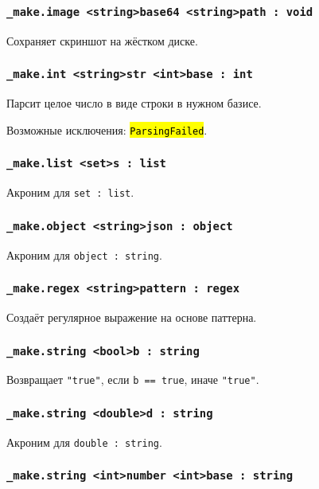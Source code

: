 \documentclass[a4paper, 14pt]{extarticle}
\newcommand{\ferror}[1]{\foreignlanguage{english}{\fontsize{11pt}{12pt}\tt{\sethlcolor{yellow}\hl{#1}}}}
\begin{document}
\subsubsection{\lstinline|_make.image <string>base64 <string>path : void|}

Сохраняет скриншот на жёстком диске.

\subsubsection{\lstinline|_make.int <string>str <int>base : int|}

Парсит целое число в виде строки в нужном базисе.

Возможные исключения: \ferror{ParsingFailed}.

\subsubsection{\lstinline|_make.list <set>s : list|}

Акроним для \lstinline|set : list|.

\subsubsection{\lstinline|_make.object <string>json : object|}

Акроним для \lstinline|object : string|.

\subsubsection{\lstinline|_make.regex <string>pattern : regex|}

Создаёт регулярное выражение на основе паттерна.

\subsubsection{\lstinline|_make.string <bool>b : string|}

Возвращает \lstinline|"true"|, если \lstinline|b == true|, иначе \lstinline|"true"|.

\subsubsection{\lstinline|_make.string <double>d : string|}

Акроним для \lstinline|double : string|.

\subsubsection{\lstinline|_make.string <int>number <int>base : string|}
\end{document}
